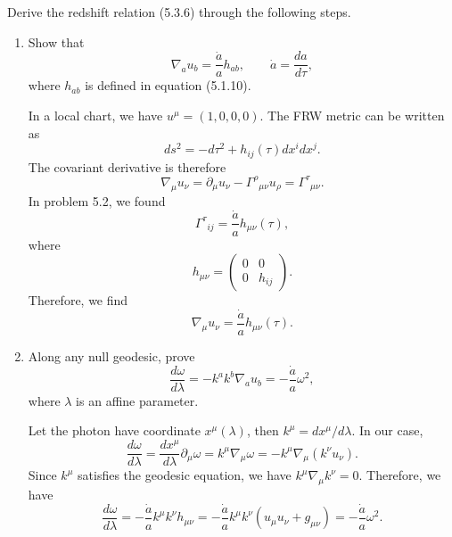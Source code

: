 Derive the redshift relation (5.3.6) through the following steps.
\begin{enumerate}[label=\alph*)]
    \item Show that
    \begin{equation}
        \nabla_a u_b=\frac{\dot a}{a}h_{ab},
        \qquad
        \dot a=\frac{da}{d\tau},
    \end{equation}
    where $h_{ab}$ is defined in equation (5.1.10).
    \begin{solution}
        In a local chart, we have $u^\mu = (1,0,0,0)$. The FRW metric can be written as
        \begin{equation}
            ds^2 = -d\tau^2 +h_{ij}(\tau)dx^i dx^j.
        \end{equation}
        The covariant derivative is therefore
        \begin{equation}
            \nabla_\mu u_\nu = \partial_\mu u_\nu  - \Gamma^\rho{}_{\mu\nu}u_\rho = \Gamma^\tau{}_{\mu\nu}.
        \end{equation}
        In problem 5.2, we found
        \begin{equation}
            \Gamma^\tau{}_{ij} = \frac{\dot a}{a}h_{\mu\nu}(\tau),
        \end{equation}
        where
        \begin{equation}
        h_{\mu\nu}=
            \begin{pmatrix}
                0 &0\\0&h_{ij}
            \end{pmatrix}.
        \end{equation}
        Therefore, we find
        \begin{equation}
            \nabla_\mu u_\nu = \frac{\dot a}{a}h_{\mu\nu}(\tau).
        \end{equation}
    \end{solution}

    \item Along any null geodesic, prove
    \begin{equation}
        \frac{d\omega}{d\lambda}
        =-k^ak^b\nabla_a u_b
        =-\frac{\dot a}{a}\omega^2,
    \end{equation}
    where $\lambda$ is an affine parameter.
    \begin{solution}
        Let the photon have coordinate $x^\mu(\lambda)$, then $k^\mu = dx^\mu/d\lambda$. In our case,
        \begin{equation}
            \frac{d\omega}{d\lambda} = \frac{d x^\mu}{d\lambda}\partial_\mu \omega =k^\mu\nabla_\mu \omega = -k^\mu \nabla_\mu (k^\nu u_\nu).
        \end{equation}
        Since $k^\mu$ satisfies the geodesic equation, we have $k^\mu \nabla_\mu k^\nu =0$. Therefore, we have
        \begin{equation}
            \frac{d\omega}{d\lambda} = - \frac{\dot a}{a}k^\mu k^\nu h_{\mu\nu} = - \frac{\dot a}{a}k^\mu k^\nu (u_\mu u_\nu + g_{\mu\nu}) = -\frac{\dot a}{a}\omega^2.
        \end{equation}
    \end{solution}


\end{enumerate}

